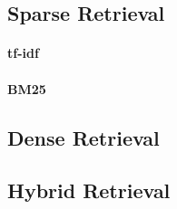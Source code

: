 \subsection{Sparse Retrieval}
\label{sec:sparse_retrieval}

\paragraph{tf-idf}
\label{sec:tfidf}

\paragraph{BM25}
\label{sec:bm25}

\subsection{Dense Retrieval}
\label{sec:dense_retrieval}


\subsection{Hybrid Retrieval}